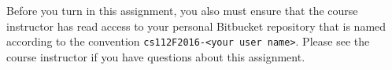 \vspace*{-.05in}

Before you turn in this assignment, you also must ensure that the course instructor has read access to your personal
Bitbucket repository that is named according to the convention {\tt cs112F2016-<your user name>}. Please see the course
instructor if you have questions about this assignment.


